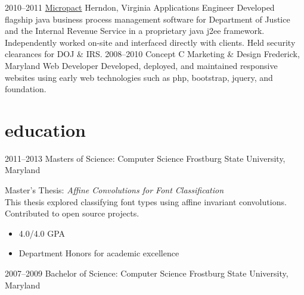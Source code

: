 \documentclass[]{friggeri-cv} %
\begin{document}
\begin{entrylist}
{}
\entry
{2010--2011}
{\href{https://www.micropact.com/}{Micropact}}
{Herndon, Virginia}
{Applications Engineer}
{
	Developed flagship java business process management software for Department of Justice and the Internal Revenue Service in a proprietary java j2ee framework. Independently worked on-site and interfaced directly with clients. Held security clearances for DOJ \& IRS.
}
\entry
{2008--2010}
{Concept C Marketing \& Design}
{Frederick, Maryland}
{Web Developer}
{
	Developed, deployed, and maintained responsive websites using early web technologies such as php, bootstrap, jquery, and foundation.
}
\end{entrylist}

\section{education}

\begin{entrylist}
\entryFour
{2011--2013}
{Masters {\normalfont of Science: Computer Science}}
{Frostburg State University, Maryland}
{
Master's Thesis: \emph{Affine Convolutions for Font Classification} \\ This thesis explored classifying font types using affine invariant convolutions. \\
Contributed to open source projects.
	\begin{itemize}
	\item 4.0/4.0 GPA
	\item Department Honors for academic excellence 
	\end{itemize}
}
\entryFour
{2007--2009}
{Bachelor {\normalfont of Science: Computer Science}}
{Frostburg State University, Maryland}
{}

\end{entrylist}
\end{document}
